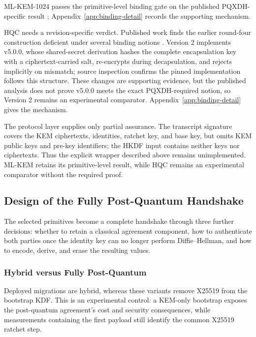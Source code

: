 ML-KEM-1024 passes the primitive-level binding gate on the published PQXDH-specific result \cite{fiedler_security_2024}; Appendix~\ref{app:binding-detail} records the supporting mechanism.

HQC needs a revision-specific verdict. Published work finds the earlier round-four construction deficient under several binding notions \cite{noauthor_binding_nodate}. Version 2 implements v5.0.0, whose shared-secret derivation hashes the complete encapsulation key with a ciphertext-carried salt, re-encrypts during decapsulation, and rejects implicitly on mismatch; source inspection confirms the pinned implementation follows this structure. These changes are supporting evidence, but the published analysis does not prove v5.0.0 meets the exact PQXDH-required notion, so Version 2 remains an experimental comparator. Appendix~\ref{app:binding-detail} gives the mechanism.

The protocol layer supplies only partial assurance. The transcript signature covers the KEM ciphertexts, identities, ratchet key, and base key, but omits KEM public keys and pre-key identifiers; the HKDF input contains neither keys nor ciphertexts. Thus the explicit wrapper described above remains unimplemented. ML-KEM retains its primitive-level result, while HQC remains an experimental comparator without the required proof.

\subsection{Design of the Fully Post-Quantum Handshake}
\label{subsec:variant-design}

The selected primitives become a complete handshake through three further decisions: whether to retain a classical agreement component, how to authenticate both parties once the identity key can no longer perform Diffie--Hellman, and how to encode, derive, and erase the resulting values.

\subsubsection{Hybrid versus Fully Post-Quantum}
\label{subsubsec:full-pq-decision}

Deployed migrations are hybrid, whereas these variants remove X25519 from the bootstrap KDF. This is an experimental control: a KEM-only bootstrap exposes the post-quantum agreement's cost and security consequences, while measurements containing the first payload still identify the common X25519 ratchet step.

